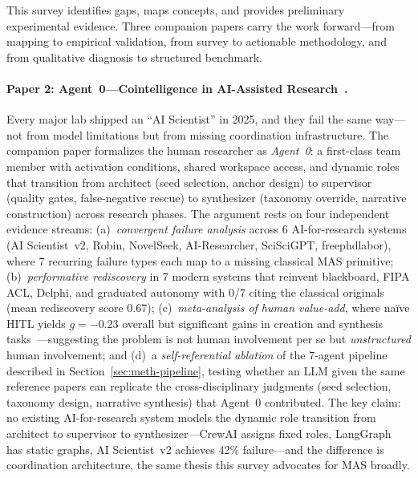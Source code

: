\documentclass{article}
\begin{document}
This survey identifies gaps, maps concepts, and provides preliminary experimental
evidence. Three companion papers carry the work forward---from mapping to
empirical validation, from survey to actionable methodology, and from qualitative
diagnosis to structured benchmark.

\paragraph{Paper 2: Agent~0---Cointelligence in AI-Assisted
Research~\citep{viswanathan2026agent0}.}
Every major lab shipped an ``AI Scientist'' in 2025, and they fail the same
way---not from model limitations but from missing coordination infrastructure.
The companion paper formalizes the human researcher as \emph{Agent~0}: a
first-class team member with activation conditions, shared workspace access, and
dynamic roles that transition from architect (seed selection, anchor design) to
supervisor (quality gates, false-negative rescue) to synthesizer (taxonomy
override, narrative construction) across research phases. The argument rests on
four independent evidence streams: (a)~\emph{convergent failure analysis} across
6 AI-for-research systems (AI Scientist~v2, Robin, NovelSeek, AI-Researcher,
SciSciGPT, freephdlabor), where 7 recurring failure types each map to a missing
classical MAS primitive; (b)~\emph{performative rediscovery} in 7 modern systems
that reinvent blackboard, FIPA ACL, Delphi, and graduated autonomy with 0/7
citing the classical originals (mean rediscovery score 0.67);
(c)~\emph{meta-analysis of human value-add}, where na\"ive HITL yields $g{=}{-}0.23$
overall but significant gains in creation and synthesis
tasks~\citep{vaccaro2024combinations}---suggesting the problem is not human
involvement per se but \emph{unstructured} human involvement;
and (d)~a \emph{self-referential ablation} of the 7-agent pipeline described in
Section~\ref{sec:meth-pipeline}, testing whether an LLM given the same reference
papers can replicate the cross-disciplinary judgments (seed selection, taxonomy
design, narrative synthesis) that Agent~0 contributed. The key claim: no existing
AI-for-research system models the dynamic role transition from architect to
supervisor to synthesizer---CrewAI assigns fixed roles, LangGraph has static
graphs, AI Scientist~v2 achieves 42\% failure---and the difference is
coordination architecture, the same thesis this survey advocates for MAS broadly.
\end{document}
